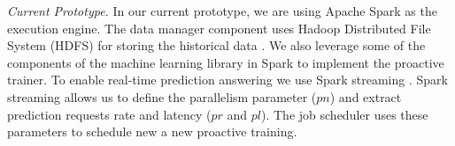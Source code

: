 \textit{Current Prototype.}
In our current prototype, we are using Apache Spark \cite{zaharia2010spark} as the execution engine.
The data manager component uses Hadoop Distributed File System (HDFS) for storing the historical data \cite{shvachko2010hadoop}.
We also leverage some of the components of the machine learning library in Spark to implement the proactive trainer.
To enable real-time prediction answering we use Spark streaming \cite{zaharia2013discretized}.
Spark streaming allows us to define the parallelism parameter ($pn$) and extract prediction requests rate and latency ($pr$ and $pl$).
The job scheduler uses these parameters to schedule new a new proactive training.
